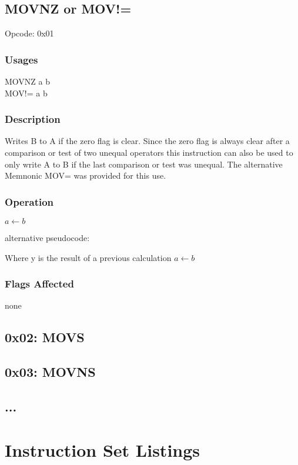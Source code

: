 \documentclass[oneside, a4paper]{memoir}
\newcommand{\instruction}[6]{
\section*{#1} %
Opcode: #2
\subsection{Usages}
#3
\subsection{Description}
#4
\subsection{Operation}
#5
\subsection{Flags Affected}
#6
\clearpage
}
\begin{document}
\instruction{MOVNZ or MOV!=}{0x01}{
MOVNZ a b \\
MOV!= a b
}{
Writes B to A if the zero flag is clear. Since the zero flag is always clear after a comparison or test of two unequal operators this instruction can also be used to only write A to B if the last comparison or test was unequal. The alternative Memnonic MOV= was provided for this use.
}{
\begin{algorithmic}
\If {$\neg Z$}
    \State $a\gets b$
\EndIf
\end{algorithmic}
alternative pseudocode:
\begin{algorithmic}
\If {$y \not= 0$} \Comment Where y is the result of a previous calculation
    \State $a\gets b$
\EndIf
\end{algorithmic}
}{none}

\section*{0x02: MOVS}
\section*{0x03: MOVNS}
\section*{...}

\appendix
\chapter{Instruction Set Listings}
\end{document}
